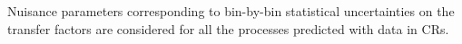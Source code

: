 Nuisance parameters corresponding to bin-by-bin statistical uncertainties on the transfer factors are considered for all the processes predicted with data in CRs. 
%


